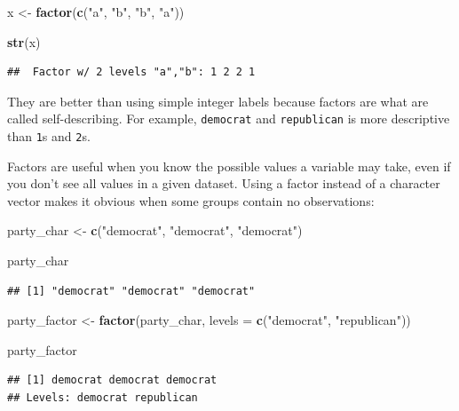 \documentclass[
]{book}
\newenvironment{Shaded}{\begin{snugshade}}{\end{snugshade}}
\newcommand{\AttributeTok}[1]{\textcolor[rgb]{0.13,0.29,0.53}{#1}}
\newcommand{\FunctionTok}[1]{\textcolor[rgb]{0.13,0.29,0.53}{\textbf{#1}}}
\newcommand{\NormalTok}[1]{#1}
\newcommand{\OtherTok}[1]{\textcolor[rgb]{0.56,0.35,0.01}{#1}}
\newcommand{\StringTok}[1]{\textcolor[rgb]{0.31,0.60,0.02}{#1}}
\begin{document}
\begin{Shaded}
\begin{Highlighting}[]
\NormalTok{x }\OtherTok{\textless{}{-}} \FunctionTok{factor}\NormalTok{(}\FunctionTok{c}\NormalTok{(}\StringTok{"a"}\NormalTok{, }\StringTok{"b"}\NormalTok{, }\StringTok{"b"}\NormalTok{, }\StringTok{"a"}\NormalTok{))}

\FunctionTok{str}\NormalTok{(x)}
\end{Highlighting}
\end{Shaded}

\begin{verbatim}
##  Factor w/ 2 levels "a","b": 1 2 2 1
\end{verbatim}

They are better than using simple integer labels because factors are what are called self-describing. For example, \texttt{democrat} and \texttt{republican} is more descriptive than \texttt{1}s and \texttt{2}s.

Factors are useful when you know the possible values a variable may take, even if you don't see all values in a given dataset. Using a factor instead of a character vector makes it obvious when some groups contain no observations:

\begin{Shaded}
\begin{Highlighting}[]
\NormalTok{party\_char }\OtherTok{\textless{}{-}} \FunctionTok{c}\NormalTok{(}\StringTok{"democrat"}\NormalTok{, }\StringTok{"democrat"}\NormalTok{, }\StringTok{"democrat"}\NormalTok{)}

\NormalTok{party\_char}
\end{Highlighting}
\end{Shaded}

\begin{verbatim}
## [1] "democrat" "democrat" "democrat"
\end{verbatim}

\begin{Shaded}
\begin{Highlighting}[]
\NormalTok{party\_factor }\OtherTok{\textless{}{-}} \FunctionTok{factor}\NormalTok{(party\_char, }\AttributeTok{levels =} \FunctionTok{c}\NormalTok{(}\StringTok{"democrat"}\NormalTok{, }\StringTok{"republican"}\NormalTok{))}

\NormalTok{party\_factor}
\end{Highlighting}
\end{Shaded}

\begin{verbatim}
## [1] democrat democrat democrat
## Levels: democrat republican
\end{verbatim}
\end{document}
